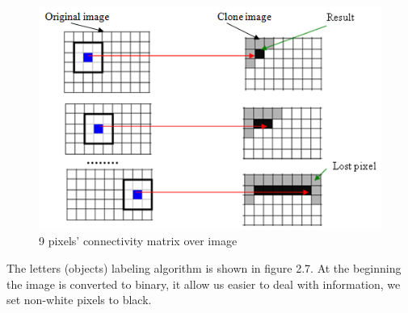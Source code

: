 \begin{figure}[H]
  \centering
  \includegraphics[scale= 0.6]{source/matriximages.png}
  \caption{9 pixels’ connectivity matrix over image}
  \label{fig:matriximages}
\end{figure}

The letters (objects) labeling algorithm is shown in figure 2.7. At the beginning the image is converted to binary, it allow us easier to deal with information, we set non-white pixels to black. 

